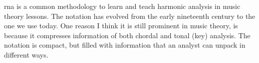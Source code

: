 

\gls{rna} is a common methodology to learn and
teach harmonic analysis in music theory lessons. The
notation has evolved from the early nineteenth century to
the one we use today. One reason I think it is still
prominent in music theory, is because it compresses
information of both chordal and tonal (key) analysis. The
notation is compact, but filled with information that an
analyst can unpack in different ways.

